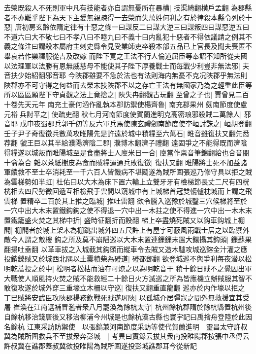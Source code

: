 去榮既殺人不死則軍中凡有技能者亦自謂無憂所在暴横|{
	技渠綺翻横戶孟翻}
為郡縣者不亦難乎陛下為天下主愛無親疎得一去榮而失萬姓何利之有於律殺本縣令列於十惡|{
	唐初房玄齡依隋定律有十惡之條一曰謀反二曰謀大逆三曰謀叛四曰謀惡逆五曰不道六曰大不敬七曰不孝八曰不睦九曰不義十曰内亂犯十惡者不得依議請之例其不義之條注曰謂殺本屬府主刺史縣令見受業師吏卒殺本部五品已上官長及聞夫喪匿不舉哀若作樂釋服從吉及改嫁}
而陛下寛之王法不行人倫道屈臣等奉詔不知所從夫國以法理軍以法勝有恩無威慈母不能使其子陛下厚養戰士而每戰少利豈非無法邪|{
	夫音扶少始紹翻邪音耶}
今陜郡雖要不急於法也有法則海内無憂不克况陜郡乎無法則陜郡亦不可守得之何益而去榮末技陜郡不以之存亡王法有無國家乃為之輕重此臣等所以區區願陛下守貞觀之法上竟捨之|{
	陜失冉翻觀古玩翻}
至曾之子也|{
	賈曾見二百十卷先天元年}
南充土豪何滔作亂執本郡防禦使楊齊魯|{
	南充郡果州}
劒南節度使盧元裕兵討平之|{
	使疏吏翻}
秋七月河南節度使賀蘭進明克高密琅邪殺賊二萬餘人|{
	邪音耶}
戊申夜蜀郡兵郭千仞等反六軍兵馬使陳玄禮劒南節度使李峘討誅之|{
	峘胡登翻}
壬子尹子奇復徵兵數萬攻睢陽先是許遠於城中積糧至六萬石|{
	睢音雖復扶又翻先悉荐翻}
虢王巨以其半給濮陽濟陰二郡|{
	濮博木翻濟子禮翻}
遠固爭之不能得既而濟陰得糧遂以城叛而睢陽城至是食盡將士人廩米日一合|{
	廩當作禀音筆錦翻給也合音閤十龠為合}
雜以茶紙樹皮為食而賊糧運通兵敗復徵|{
	復扶又翻}
睢陽將士死不加益諸軍饋救不至士卒消耗至一千六百人皆饑病不堪鬭遂為賊所圍張巡乃修守具以拒之賊為雲梯勢如半虹|{
	杜佑曰以大木為床下置六輪上立雙牙牙有檢梯節長丈二尺有四桄桄相去四尺勢微回遞互相檢飛于雲間以窺城中有上城梯首冠雙轆轤枕城而上謂之飛雲梯}
置精卒二百於其上推之臨城|{
	推吐雷翻}
欲令騰入巡豫於城鑿三穴候梯將至於一穴中出大木末置鐵鈎鉤之使不得退一穴中出一木拄之使不得進一穴中出一木木末置鐵籠盛火焚之其梯中折|{
	盛時征翻折而設翻}
梯上卒盡燒死賊又以鈎車鈎城上棚閣|{
	棚閣者於城上架木為棚跳出城外四五尺許上有屋宇可蔽風雨戰士居之以臨禦外敵今人謂之敵樓}
鈎之所及莫不崩䧟巡以大木末置連鏁鏁末置大鐶搨其鈎頭|{
	鏁蘇果翻搨吐盍翻}
以革車拔之入城截其鈎頭而縱車令去賊又造木驢攻城巡鎔金汁灌之應投銷鑠賊又於城西北隅以土囊積柴為磴道|{
	磴都鄧翻}
欲登城巡不與爭利每夜潜以松明乾蒿投之於中|{
	松明者松枯而油存可燎之以為明乾音干}
積十餘日賊不之覺因出軍大戰使人順風持火焚之賊不能救經二十餘日火方滅巡之所為皆應機立辦賊服其智不敢復攻遂於城外穿三重壕立木柵以守巡|{
	復扶又翻重直龍翻}
巡亦於内作壕以拒之　丁巳賊將安武臣攻陜郡楊務欽戰死賊遂屠陜|{
	以孤城介居彊寇之間外無救援宜其受屠}
崔渙在江南選補冒濫者衆八月罷渙為餘杭太守|{
	杭州餘杭郡隋於餘杭縣置杭州後自餘杭移治錢唐後又移治柳浦今州城是也餘杭漢古縣也寰宇記曰禹捨舟登陸於此因名餘杭}
江東采訪防禦使　以張鎬兼河南節度采訪等使代賀蘭進明　靈昌太守許叔冀為賊所圍救兵不至拔衆奔彭城　|{
	考異曰實錄云拔其衆南投睢陽郡按張中丞傳云許叔冀在譙郡蓋叔冀欲投睢陽為賊所圍遂投彭城譙郡耳今從新記}
